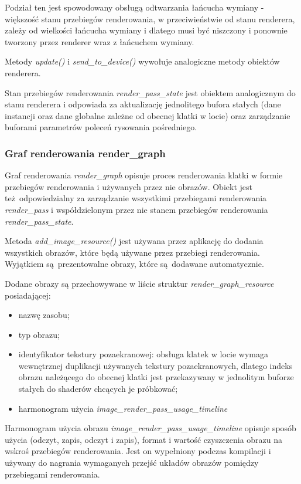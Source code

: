 Podział ten jest spowodowany obsługą odtwarzania łańcucha wymiany - większość stanu przebiegów renderowania, w przeciwieństwie od stanu renderera, zależy od wielkości łańcucha wymiany i dlatego musi być niszczony i ponownie tworzony przez renderer wraz z łańcuchem wymiany.

Metody \textit{update()} i \textit{send\_to\_device()} wywołuje analogiczne metody obiektów renderera.

Stan przebiegów renderowania \textit{render\_pass\_state} jest obiektem analogicznym do stanu renderera i odpowiada za aktualizację jednolitego bufora stałych (dane instancji oraz dane globalne zależne od obecnej klatki w locie) oraz zarządzanie buforami parametrów poleceń rysowania pośredniego.


\subsubsection{Graf renderowania render\_graph}
Graf renderowania \textit{render\_graph} opisuje proces renderowania klatki w formie przebiegów renderowania i używanych przez nie obrazów.
Obiekt jest też odpowiedzialny za zarządzanie wszystkimi przebiegami renderowania \textit{render\_pass} i współdzielonym przez nie stanem przebiegów renderowania \textit{render\_pass\_state}.

Metoda \textit{add\_image\_resource()} jest używana przez aplikację do dodania wszystkich obrazów, które będą używane przez przebiegi renderowania. Wyjątkiem są prezentowalne obrazy, które są dodawane automatycznie.

Dodane obrazy są przechowywane w liście struktur \textit{render\_graph\_resource} posiadającej:
\begin{itemize}
	\item nazwę zasobu;
	\item typ obrazu;
	\item identyfikator tekstury pozaekranowej: obsługa klatek w locie wymaga wewnętrznej duplikacji używanych tekstury pozaekranowych, dlatego indeks obrazu należącego do obecnej klatki jest przekazywany w jednolitym buforze stałych do shaderów chcących je próbkować;
	\item harmonogram użycia \textit{image\_render\_pass\_usage\_timeline}
\end{itemize}

Harmonogram użycia obrazu \textit{image\_render\_pass\_usage\_timeline} opisuje sposób użycia (odczyt, zapis, odczyt i zapis), format i wartość czyszczenia obrazu na wskroś przebiegów renderowania.
Jest on wypełniony podczas kompilacji i używany do nagrania wymaganych przejść układów obrazów pomiędzy przebiegami renderowania.

